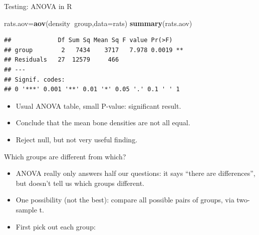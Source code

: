 \documentclass[ignorenonframetext,]{beamer}
\newenvironment{Shaded}{\begin{snugshade}}{\end{snugshade}}
\newcommand{\DataTypeTok}[1]{\textcolor[rgb]{0.13,0.29,0.53}{#1}}
\newcommand{\KeywordTok}[1]{\textcolor[rgb]{0.13,0.29,0.53}{\textbf{#1}}}
\newcommand{\NormalTok}[1]{#1}
\newcommand{\OperatorTok}[1]{\textcolor[rgb]{0.81,0.36,0.00}{\textbf{#1}}}
\newcommand{\StringTok}[1]{\textcolor[rgb]{0.31,0.60,0.02}{#1}}
\providecommand{\tightlist}{%
  \setlength{\itemsep}{0pt}\setlength{\parskip}{0pt}}
\begin{document}
\begin{frame}[fragile]{Testing: ANOVA in R}
\protect\hypertarget{testing-anova-in-r}{}

\begin{Shaded}
\begin{Highlighting}[]
\NormalTok{rats.aov=}\KeywordTok{aov}\NormalTok{(density}\OperatorTok{~}\NormalTok{group,}\DataTypeTok{data=}\NormalTok{rats)}
\KeywordTok{summary}\NormalTok{(rats.aov)}
\end{Highlighting}
\end{Shaded}

\begin{verbatim}
##             Df Sum Sq Mean Sq F value Pr(>F)   
## group        2   7434    3717   7.978 0.0019 **
## Residuals   27  12579     466                  
## ---
## Signif. codes:  
## 0 '***' 0.001 '**' 0.01 '*' 0.05 '.' 0.1 ' ' 1
\end{verbatim}

\begin{itemize}
\tightlist
\item
  Usual ANOVA table, small P-value: significant result.
\item
  Conclude that the mean bone densities are not all equal.
\item
  Reject null, but not very useful finding.
\end{itemize}

\end{frame}

\begin{frame}[fragile]{Which groups are different from which?}
\protect\hypertarget{which-groups-are-different-from-which}{}

\begin{itemize}
\tightlist
\item
  ANOVA really only answers half our questions: it says ``there are
  differences'', but doesn't tell us which groups different.
\item
  One possibility (not the best): compare all possible pairs of groups,
  via two-sample t.
\item
  First pick out each group:
\end{itemize}

\begin{Shaded}
\end{Shaded}

\end{frame}
\end{document}
